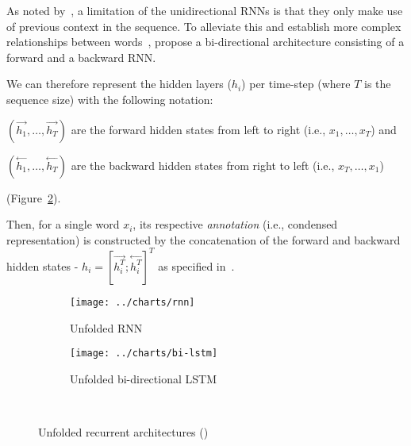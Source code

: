 As noted by~\cite{graveshinton2013speech}, a limitation of the unidirectional RNNs is that they only make use of previous context in the sequence.
To alleviate this and establish more complex relationships between words~\cite{schuster1997birnn}, propose a bi-directional architecture consisting of a forward and a backward RNN\@.

We can therefore represent the hidden layers ($h_i$) per time-step (where $T$ is the sequence size) with the following notation: \begin{enumerate*}
    \item $(\overset{\longrightarrow}{h_1}, \ldots, \overset{\longrightarrow}{h_T})$ are the forward hidden states from left to right (i.e., $x_1,\ldots,x_T$) and
    \item $(\overset{\longleftarrow}{h_1}, \ldots, \overset{\longleftarrow}{h_T})$ are the backward hidden states from right to left (i.e., $x_T,\ldots,x_1$)
\end{enumerate*} (Figure~\ref{fig:bilstm}).

Then, for a single word $x_i$, its respective \emph{annotation} (i.e., condensed representation) is constructed by the concatenation of the forward and backward hidden states - $h_i = [\overset{\longrightarrow}{h_i^T}; \overset{\longleftarrow}{h_i^T}]^T$ as specified in~\cite{bahdanau2016neural}.

\begin{figure}[ht]
    \begin{subfigure}{0.49\textwidth}
        \centering
        \texttt{[image: ../charts/rnn]}
        \caption{Unfolded RNN}
        \label{fig:rnn}
    \end{subfigure}%
    \hfill
    \begin{subfigure}{0.49\textwidth}
        \centering
        \texttt{[image: ../charts/bi-lstm]}
        \caption{Unfolded bi-directional LSTM}
        \label{fig:bilstm}
    \end{subfigure}~\caption{Unfolded recurrent architectures (\cite{zhiyong2018bilstm})}
    \label{fig:recurrent_unfolded}
\end{figure}

